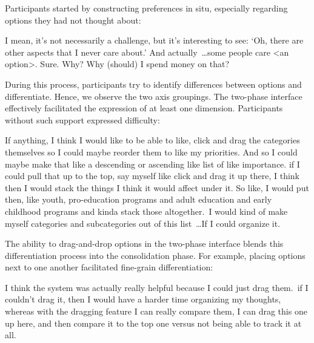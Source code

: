 Participants started by constructing preferences in situ, especially regarding options they had not thought about:
\begin{displayquote}

    I mean, it's not necessarily a challenge, but it's interesting to see: `Oh, there are other aspects that I never care about.' And actually~\ldots some people care <an option>. Sure. Why? Why (should) I spend money on that? \\\hfill{}
\end{displayquote}

During this process, participants try to identify differences between options and differentiate. Hence, we observe the two axis groupings. The two-phase interface effectively facilitated the expression of at least one dimension. Participants without such support expressed difficulty:

\begin{displayquote}
    If anything, I think I would like to be able to like, click and drag the categories themselves so I could maybe reorder them to like my priorities. And so I could maybe make that like a descending or ascending like list of like importance. \bracketellipsis if I could pull that up to the top, say myself like click and drag it up there, I think then I would stack the things I think it would affect under it. So like, I would put then, like youth, pro-education programs and adult education and early childhood programs and kinda stack those altogether.~\bracketellipsis I would kind of make myself categories and subcategories out of this list~\ldots If I could organize it. \hfill{}
\end{displayquote}

The ability to drag-and-drop options in the two-phase interface blends this differentiation process into the consolidation phase. For example, placing options next to one another facilitated fine-grain differentiation:

\begin{displayquote}
    I think the system was actually really helpful because I could just drag them.~\bracketellipsis if I couldn't drag it, then I would have a harder time organizing my thoughts, whereas with the dragging feature I can really compare them, I can drag this one up here, and then compare it to the top one versus not being able to track it at all. \\\hfill{}
\end{displayquote}

